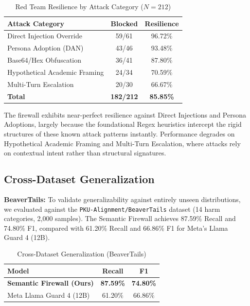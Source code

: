 \documentclass[conference]{IEEEtran}
\begin{document}
\begin{table}[htbp]
\centering
\caption{Red Team Resilience by Attack Category ($N{=}212$)}
\label{tab:redteam-breakdown}
\begin{tabular}{@{}lcc@{}}
\toprule
\textbf{Attack Category} & \textbf{Blocked} & \textbf{Resilience} \\
\midrule
Direct Injection Override & 59/61 & 96.72\% \\
Persona Adoption (DAN) & 43/46 & 93.48\% \\
Base64/Hex Obfuscation & 36/41 & 87.80\% \\
Hypothetical Academic Framing & 24/34 & 70.59\% \\
Multi-Turn Escalation & 20/30 & 66.67\% \\
\midrule
\textbf{Total} & \textbf{182/212} & \textbf{85.85\%} \\
\bottomrule
\end{tabular}
\end{table}

The firewall exhibits near-perfect resilience against Direct Injections and Persona Adoptions, largely because the foundational Regex heuristics intercept the rigid structures of these known attack patterns instantly. Performance degrades on Hypothetical Academic Framing and Multi-Turn Escalation, where attacks rely on contextual intent rather than structural signatures.

\subsection{Cross-Dataset Generalization}

\textbf{BeaverTails:} To validate generalizability against entirely unseen distributions, we evaluated against the \texttt{PKU-Alignment/BeaverTails} dataset (14 harm categories, 2,000 samples). The Semantic Firewall achieves 87.59\% Recall and 74.80\% F1, compared with 61.20\% Recall and 66.86\% F1 for Meta's Llama Guard 4 (12B).

\begin{table}[htbp]
\centering
\caption{Cross-Dataset Generalization (BeaverTails)}
\label{tab:beavertails}
\begin{tabular}{@{}lcc@{}}
\toprule
\textbf{Model} & \textbf{Recall} & \textbf{F1} \\
\midrule
\textbf{Semantic Firewall (Ours)} & \textbf{87.59\%} & \textbf{74.80\%} \\
Meta Llama Guard 4 (12B) & 61.20\% & 66.86\% \\
\bottomrule
\end{tabular}
\end{table}
\end{document}
